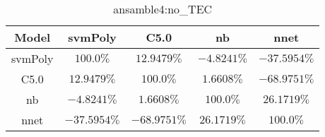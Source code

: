 \begin{table}[!ht]
	\centering
	\begin{tabular}{|c|c|c|c|c|}
		\hline
		Model & svmPoly & C5.0 & nb & nnet \\ \hline
		svmPoly & $100.0\%$ & $12.9479\%$ & $-4.8241\%$ & $-37.5954\%$ \\ \hline
		C5.0 & $12.9479\%$ & $100.0\%$ & $1.6608\%$ & $-68.9751\%$ \\ \hline
		nb & $-4.8241\%$ & $1.6608\%$ & $100.0\%$ & $26.1719\%$ \\ \hline
		nnet & $-37.5954\%$ & $-68.9751\%$ & $26.1719\%$ & $100.0\%$ \\ \hline
	\end{tabular}
	\caption{ansamble4:no_TEC}
	\label{tab:ansamble4:no_TEC}
\end{table}
